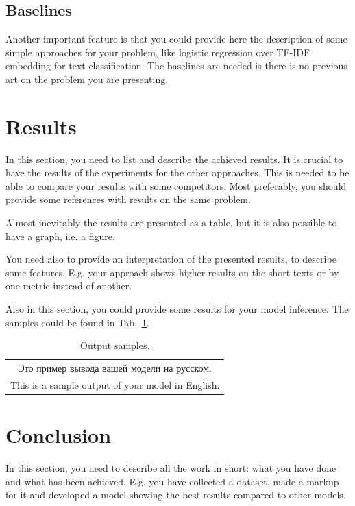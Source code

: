 \documentclass[a4paper,12pt]{article}
\begin{document}
\subsection{Baselines}
Another important feature is that you could provide here the description of some simple approaches for your problem, like logistic regression over TF-IDF embedding for text classification. The baselines are needed is there is no previous art on the problem you are presenting.

\section{Results}
In this section, you need to list and describe the achieved results. It is crucial to have the results of the experiments for the other approaches. This is needed to be able to compare your results with some competitors. Most preferably, you should provide some references with results on the same problem.

Almost inevitably the results are presented as a table, but it is also possible to have a graph, i.e. a figure.

You need also to provide an interpretation of the presented results, to describe some features. E.g. your approach shows higher results on the short texts or by one metric instead of another.

Also in this section, you could provide some results for your model inference. The samples could be found in Tab.~\ref{tab:output}.

\begin{table}[!tbh]
    \centering
    \begin{tabular}{|c|}
\hline
Это пример вывода вашей модели на русском.\\
This is a sample output of your model in English.
\\
\hline
    \end{tabular}
    \caption{Output samples.}
    \label{tab:output}
\end{table}

\section{Conclusion}
In this section, you need to describe all the work in short: what you have done and what has been achieved. E.g. you have collected a dataset, made a markup for it and developed a model showing the best results compared to other models. 


\begin{otherlanguage}{english}
\printbibliography[
    heading=bibintoc
]
\end{otherlanguage}
\end{document}
